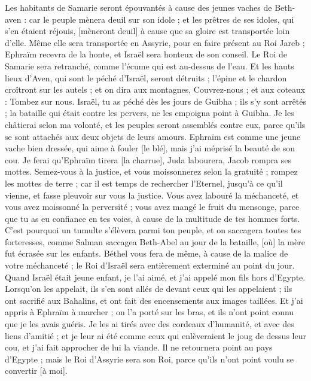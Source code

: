 \begin{multicols}{2}
Les habitants de Samarie seront épouvantés à cause des jeunes vaches de Beth-aven : car le peuple mènera deuil sur son idole ; et les prêtres de ses idoles, qui s'en étaient réjouis, [mèneront deuil] à cause que sa gloire est transportée loin d'elle.
Même elle sera transportée en Assyrie, pour en faire présent au Roi Jareb ; Ephraïm recevra de la honte, et Israël sera honteux de son conseil.
Le Roi de Samarie sera retranché, comme l'écume qui est au-dessus de l'eau.
Et les hauts lieux d'Aven, qui sont le péché d'Israël, seront détruits ; l'épine et le chardon croîtront sur les autels ; et on dira aux montagnes, Couvrez-nous ; et aux coteaux : Tombez sur nous.
Israël, tu as péché dès les jours de Guibha ; ils s'y sont arrêtés ; la bataille qui était contre les pervers, ne les empoigna point à Guibha.
Je les châtierai selon ma volonté, et les peuples seront assemblés contre eux, parce qu'ils se sont attachés aux deux objets de leurs amours.
Ephraïm est comme une jeune vache bien dressée, qui aime à fouler [le blé], mais j'ai méprisé la beauté de son cou. Je ferai qu'Ephraïm tirera [la charrue], Juda labourera, Jacob rompra ses mottes.
Semez-vous à la justice, et vous moissonnerez selon la gratuité ; rompez les mottes de terre ; car il est temps de rechercher l'Eternel, jusqu'à ce qu'il vienne, et fasse pleuvoir sur vous la justice.
Vous avez labouré la méchanceté, et vous avez moissonné la perversité ; vous avez mangé le fruit du mensonge, parce que tu as eu confiance en tes voies, à cause de la multitude de tes hommes forts.
C'est pourquoi un tumulte s'élèvera parmi ton peuple, et on saccagera toutes tes forteresses, comme Salman saccagea Beth-Abel au jour de la bataille, [où] la mère fut écrasée sur les enfants.
Béthel vous fera de même, à cause de la malice de votre méchanceté ; le Roi d'Israël sera entièrement exterminé au point du jour.
\VerseOne{}Quand Israël était jeune enfant, je l'ai aimé, et j'ai appelé mon fils hors d'Egypte.
Lorsqu'on les appelait, ils s'en sont allés de devant ceux qui les appelaient ; ils ont sacrifié aux Bahalins, et ont fait des encensements aux images taillées.
Et j'ai appris à Ephraïm à marcher ; on l'a porté sur les bras, et ils n'ont point connu que je les avais guéris.
Je les ai tirés avec des cordeaux d'humanité, et avec des liens d'amitié ; et je leur ai été comme ceux qui enlèveraient le joug de dessus leur cou, et j'ai fait approcher de lui la viande.
Il ne retournera point au pays d'Egypte ; mais le Roi d'Assyrie sera son Roi, parce qu'ils n'ont point voulu se convertir [à moi].

\end{multicols}
